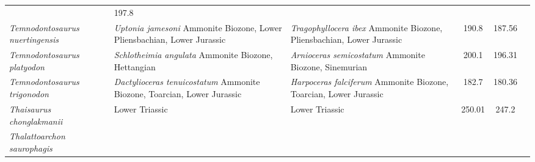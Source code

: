 \begin{longtabu}{>{\itshape}lXXSSl}
                                                             & 197.8
                                                             &
                                                             \cite{McGowan1974LSCROM} \\                    
	Temnodontosaurus nuertingensis                       & \emph{Uptonia
        jamesoni} Ammonite Biozone, Lower Pliensbachian, Lower Jurassic
                                                             &
            \emph{Tragophyllocera ibex} Ammonite Biozone, Pliensbachian, Lower
            Jurassic                                                        &
            190.8                    & 187.56                   &
            \cite{vonHuene1931NJFMGPBB,Maisch1997SBNBGP} \\          
	Temnodontosaurus platyodon                           &
        \emph{Schlotheimia angulata} Ammonite Biozone, Hettangian
                                                             & \emph{Arnioceras
    semicostatum} Ammonite Biozone, Sinemurian
                                                             & 200.1
                                                             & 196.31
                                                             &
                                                             \cite{McGowan1974LSCROM} \\                    
	Temnodontosaurus trigonodon                          &
        \emph{Dactylioceras tenuicostatum} Ammonite Biozone, Toarcian, Lower
        Jurassic                                                      &
        \emph{Harpoceras falciferum} Ammonite Biozone, Toarcian, Lower Jurassic
                                                                      & 182.7
                                                                      & 180.36
                                                                      &
                                                                      \cite{Fraas1891,vonHuene1922} \\           
	Thaisaurus chonglakmanii                             & Lower Triassic
                                                             & Lower Triassic
                                                             & 250.01
                                                             & 247.2
                                                             &
                                                             \cite{Mazin1991CRASS2MPCSUST} \\                      
	Thalattoarchon saurophagis                           &

\end{longtabu}
